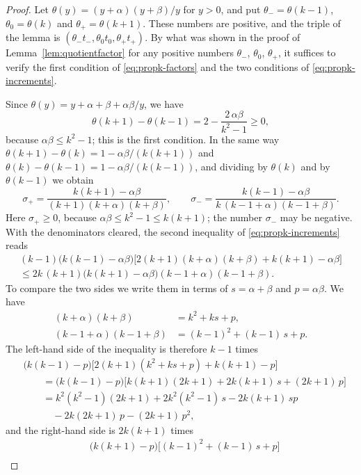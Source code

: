 \documentclass{amsart}
\theoremstyle{definition}
\theoremstyle{remark}
\numberwithin{equation}{section}
\begin{document}
\begin{proof}
Let $\theta(y)=(y+\alpha)(y+\beta)/y$ for $y>0$, and put
$\theta_-=\theta(k-1)$, $\theta_0=\theta(k)$ and $\theta_+=\theta(k+1)$.
These numbers are positive, and the triple of the lemma is
$(\theta_-t_-,\theta_0t_0,\theta_+t_+)$. By what was shown in the proof of
Lemma~\ref{lem:quotientfactor} for any positive numbers $\theta_-$,
$\theta_0$, $\theta_+$, it suffices to verify the first condition of
\eqref{eq:propk-factors} and the two conditions of
\eqref{eq:propk-increments}.

Since $\theta(y)=y+\alpha+\beta+\alpha\beta/y$, we have
\[
\theta(k+1)-\theta(k-1)=2-\frac{2\,\alpha\beta}{k^2-1}\ge0 ,
\]
because $\alpha\beta\le k^2-1$; this is the first condition. In the same way
$\theta(k+1)-\theta(k)=1-\alpha\beta/(k(k+1))$ and
$\theta(k)-\theta(k-1)=1-\alpha\beta/(k(k-1))$, and dividing by $\theta(k)$
and by $\theta(k-1)$ we obtain
\[
\sigma_+=\frac{k(k+1)-\alpha\beta}{(k+1)(k+\alpha)(k+\beta)},\qquad
\sigma_-=\frac{k(k-1)-\alpha\beta}{k\,(k-1+\alpha)(k-1+\beta)} .
\]
Here $\sigma_+\ge0$, because $\alpha\beta\le k^2-1\le k(k+1)$; the number
$\sigma_-$ may be negative. With the denominators cleared, the second
inequality of \eqref{eq:propk-increments} reads
\begin{multline*}
(k-1)\bigl(k(k-1)-\alpha\beta\bigr)
\bigl[2(k+1)(k+\alpha)(k+\beta)+k(k+1)-\alpha\beta\bigr]\\
\le2k\,(k+1)\bigl(k(k+1)-\alpha\beta\bigr)(k-1+\alpha)(k-1+\beta) .
\end{multline*}
To compare the two sides we write them in terms of $s=\alpha+\beta$ and
$p=\alpha\beta$. We have
\begin{align*}
(k+\alpha)(k+\beta)&=k^2+ks+p,\\
(k-1+\alpha)(k-1+\beta)&=(k-1)^2+(k-1)\,s+p .
\end{align*}
The left-hand side of the inequality is therefore $k-1$ times
\begin{align*}
&\bigl(k(k-1)-p\bigr)\bigl[2(k+1)(k^2+ks+p)+k(k+1)-p\bigr]\\
&\qquad=\bigl(k(k-1)-p\bigr)
\bigl[k(k+1)(2k+1)+2k(k+1)\,s+(2k+1)\,p\bigr]\\
&\qquad=k^2(k^2-1)(2k+1)+2k^2(k^2-1)\,s-2k(k+1)\,sp\\
&\qquad\quad-2k(2k+1)\,p-(2k+1)\,p^2 ,
\end{align*}
and the right-hand side is $2k(k+1)$ times
\begin{align*}
&\bigl(k(k+1)-p\bigr)\bigl[(k-1)^2+(k-1)\,s+p\bigr]\\

\end{align*}
\end{proof}
\end{document}
